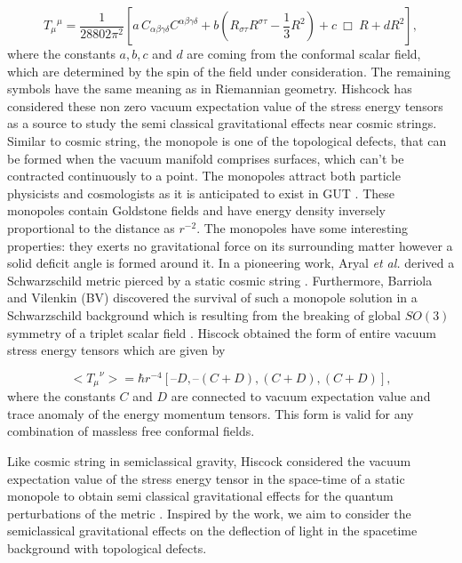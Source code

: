 \documentclass[preprint,superscriptaddress,amsfonts,amssymb,amsmath,showpacs]{revtex4}
\begin{document}
\[{T_\mu}^\mu  = \frac{1}{28802 \pi^2} \left[ a \,C_{\alpha \beta \gamma \delta}C^{\alpha \beta \gamma \delta} + b \left( R_{\sigma \tau}R^{\sigma \tau}-\frac{1}{3} R^2\right) + c ~\Box ~R + d R^2 \right],\]
where the constants $ a, b, c $ and $d$ are coming from the conformal scalar field, which are determined by the spin of the field under
consideration. The remaining symbols have the same meaning as in Riemannian geometry. Hishcock \cite{Hiscock2} has considered these non zero vacuum expectation value of the stress energy tensors as a 
 source to study the semi classical gravitational effects near    
cosmic strings. Similar to cosmic string, the monopole is one of the topological defects,  that can be formed  when the vacuum manifold comprises surfaces, which can’t be contracted continuously to a point.  The monopoles attract  both particle physicists and cosmologists  as it is anticipated to exist in GUT   \cite{vs}  . These monopoles contain Goldstone fields  and have  energy density  inversely proportional to the  distance as $r^{-2}$.  The monopoles have some interesting properties: they exerts no gravitational force on its surrounding  matter \cite{Rahaman3}  however a solid deficit angle is formed around it.  In a pioneering work, Aryal \textit{et al.} derived a Schwarzschild  metric pierced by a static cosmic string \cite{vilenkin2}. Furthermore, Barriola and Vilenkin (BV) discovered  the survival of such a monopole solution in a Schwarzschild background which is resulting from the breaking of global $SO(3)$ symmetry of a triplet scalar field \cite{vilenkin3}. 
Hiscock \cite{Hiscock1} obtained the form of entire vacuum stress energy tensors which are given by 

\[  <{T_\mu}^\nu> = \hbar r^{-4} \left[– D , – ( C + D ) , ( C + D ) , ( C + D ) \right],\] 
 where the constants  $C$ and $D$ are  connected to vacuum expectation value and trace anomaly of the energy momentum tensors. This form is valid for any combination of massless free conformal fields.

Like cosmic string in semiclassical gravity, Hiscock considered the vacuum expectation value of the stress energy tensor in the space-time of a static monopole to obtain semi classical gravitational effects for the quantum perturbations of the metric \cite{Hiscock2}. Inspired by the work, we aim to consider the semiclassical gravitational effects on the deflection of light in the spacetime background with topological defects.
\end{document}
